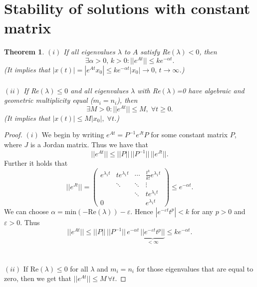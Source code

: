 \documentclass[12pt, a4paper]{article}
\newtheorem{theorem}{Theorem}[section]
\begin{document}
\section{Stability of solutions with constant matrix}
\begin{theorem}
$(i)$ If all eigenvalues $\lambda$ to $A$ satisfy Re$(\lambda)<0$, then 
\begin{equation*}
\exists \alpha>0,\, k>0 : ||e^{At}||\leq ke^{-\alpha t}.
\end{equation*}
(It implies that $|x(t)| = |e^{At}x_0|\leq ke^{-\alpha t}|x_0| \to 0,\, t\to\infty$.)
\\\\
$(ii)$ If Re$(\lambda)\leq 0$ and all eigenvalues $\lambda$ with Re$(\lambda)$=0 have algebraic and geometric multiplicity equal ($m_i = n_i$), then
\begin{equation*}
\exists M>0 : ||e^{At}||\leq M,\; \forall t \geq 0.
\end{equation*}
(It implies that $|x(t)|\leq M |x_0|,\; \forall t$.)
\end{theorem}
\begin{proof}
$(i)$ We begin by writing $e^{At} = P^{-1}e^{Jt}P$ for some constant matrix $P$, where $J$ is a Jordan matrix. Thus we have that
\begin{equation*}
||e^{At}||\leq ||P||\,||P^{-1}||\,||e^{Jt}||.
\end{equation*}
Further it holds that
\begin{equation*}
||e^{Jt}|| =
 \begin{pmatrix}
  e^{\lambda_1 t} & te^{\lambda_1 t} & \cdots & \frac{t^k}{k!}e^{\lambda_1 t} \\
   & \ddots & \ddots & \vdots \\
    &   & \ddots & te^{\lambda_1 t}  \\
  0 &  &  & e^{\lambda_1 t}
 \end{pmatrix}
 \leq e^{-\alpha t}.
\end{equation*}
We can choose $\alpha =$min$\left(-\text{Re}(\lambda)\right)-\varepsilon$.
Hence $|e^{-\varepsilon t}t^p|<k$ for any $p>0$ and $\varepsilon>0$. Thus
\begin{equation*}
||e^{At}||\leq ||P||\,||P^{-1}||\,e^{-\alpha t}\, \underbrace{||e^{-\varepsilon t}t^p||}_{<\infty} \leq ke^{-\alpha t}.
\end{equation*}
\\\\
$(ii)$ If Re$(\lambda)\leq 0$ for all $\lambda$ and $m_i = n_i$ for those eigenvalues that are equal to zero, then we get that $||e^{At}||\leq M\, \forall t$. 
\end{proof}
\end{document}
